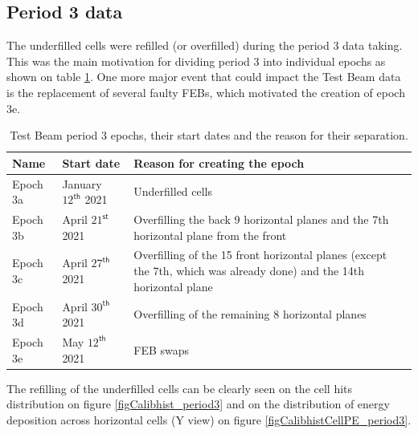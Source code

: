 \documentclass[12pt,a4paper]{article}
\begin{document}
\subsection{Period 3 data}
The underfilled cells were refilled (or overfilled) during the period 3 data taking. This was the main motivation for dividing period 3 into individual epochs as shown on table \ref{tabTestBeamPeriod3Epochs}. One more major event that could impact the Test Beam data is the replacement of several faulty FEBs, which motivated the creation of epoch 3e.

\begin{table}[!ht]
\centering
\def\arraystretch{1.4}
\begin{tabular}{m{} m{} m{}}
Name & Start date & Reason for creating the epoch\\\hline
Epoch 3a & January $12^{\textsf{th}}$ 2021 & Underfilled cells\\
Epoch 3b & April $21^{\textsf{st}}$ 2021 & Overfilling the back 9 horizontal planes and the 7th horizontal plane from the front\\
Epoch 3c & April $27^{\textsf{th}}$ 2021 & Overfilling of the 15 front horizontal planes (except the 7th, which was already done) and the 14th horizontal plane\\
Epoch 3d & April $30^{\textsf{th}}$ 2021 & Overfilling of the remaining 8 horizontal planes\\
Epoch 3e & May $12^{\textsf{th}}$ 2021 & FEB swaps
\end{tabular}
\caption{Test Beam period 3 epochs, their start dates and the reason for their separation.}
\label{tabTestBeamPeriod3Epochs}
\end{table}

The refilling of the underfilled cells can be clearly seen on the cell hits distribution on figure \ref{figCalibhist_period3} and on the distribution of energy deposition across horizontal cells (Y view) on figure \ref{figCalibhistCellPE_period3}.
\end{document}
